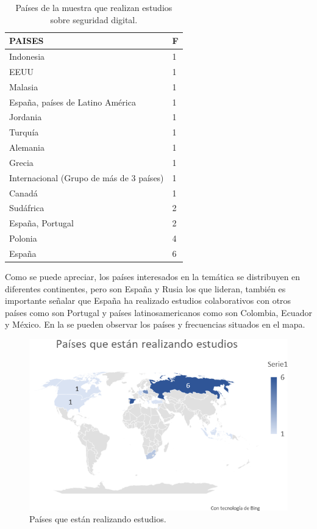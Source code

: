 \documentclass[spanish]{textolivre}
\begin{document}
\begin{table}[htbp]
\centering
\begin{threeparttable}
\caption{Países de la muestra que realizan estudios sobre seguridad digital.}
\label{tbl2}
\begin{tabular}{ll}
\toprule
PAISES & F  \\ 
\midrule
Indonesia & 1 \\
EEUU & 1 \\
Malasia & 1 \\
España, países de Latino América & 1 \\
Jordania & 1 \\
Turquía & 1 \\
Alemania & 1 \\
Grecia & 1 \\
Internacional (Grupo de más de 3 países) & 1 \\
Canadá & 1 \\
Sudáfrica & 2 \\
España, Portugal & 2 \\
Polonia & 4 \\
España & 6 \\ 
\bottomrule
\end{tabular}
\end{threeparttable}
\end{table}

Como se puede apreciar, los países interesados en la temática se distribuyen en diferentes continentes, pero son España y Rusia los que lideran, también es importante señalar que España ha realizado estudios colaborativos con otros países como son Portugal y países latinosamericanos como son Colombia, Ecuador y México. En la  se pueden observar los países y frecuencias situados en el mapa.

\begin{figure}[h!]
\centering
\begin{minipage}{0.65\textwidth}
\includegraphics[width=\textwidth]{Fig6.png}
\caption{Países que están realizando estudios.}
\label{fig6}
\end{minipage}
\end{figure}
\end{document}
